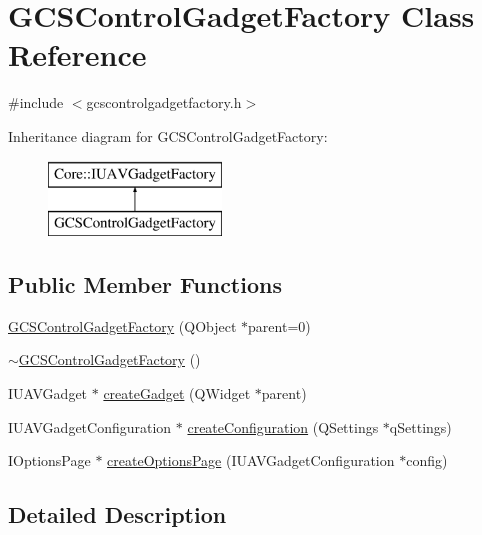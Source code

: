 \hypertarget{class_g_c_s_control_gadget_factory}{\section{\-G\-C\-S\-Control\-Gadget\-Factory \-Class \-Reference}
\label{class_g_c_s_control_gadget_factory}
}


{\ttfamily \#include $<$gcscontrolgadgetfactory.\-h$>$}

\-Inheritance diagram for \-G\-C\-S\-Control\-Gadget\-Factory\-:\begin{figure}[H]
\begin{center}
\leavevmode
\includegraphics[height=2.000000cm]{class_g_c_s_control_gadget_factory}
\end{center}
\end{figure}
\subsection*{\-Public \-Member \-Functions}
\begin{DoxyCompactItemize}
\item 
\hyperlink{group___g_c_s_control_gadget_plugin_ga4c54b8d610c379bf28bff1793365f00a}{\-G\-C\-S\-Control\-Gadget\-Factory} (\-Q\-Object $\ast$parent=0)
\item 
\hyperlink{group___g_c_s_control_gadget_plugin_ga1e3479dbedd932e780c0413327a44453}{$\sim$\-G\-C\-S\-Control\-Gadget\-Factory} ()
\item 
\-I\-U\-A\-V\-Gadget $\ast$ \hyperlink{group___g_c_s_control_gadget_plugin_ga36b826b28ef2eea9aef96c03fe2afcb5}{create\-Gadget} (\-Q\-Widget $\ast$parent)
\item 
\-I\-U\-A\-V\-Gadget\-Configuration $\ast$ \hyperlink{group___g_c_s_control_gadget_plugin_ga707c9075a9e10d166b1769820e643095}{create\-Configuration} (\-Q\-Settings $\ast$q\-Settings)
\item 
\-I\-Options\-Page $\ast$ \hyperlink{group___g_c_s_control_gadget_plugin_gaee4fe12f6708684eb50d0bd348633e8a}{create\-Options\-Page} (\-I\-U\-A\-V\-Gadget\-Configuration $\ast$config)
\end{DoxyCompactItemize}


\subsection{\-Detailed \-Description}



